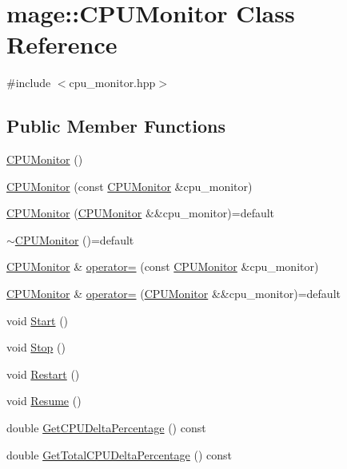 \hypertarget{classmage_1_1_c_p_u_monitor}{}\section{mage\+:\+:C\+P\+U\+Monitor Class Reference}
\label{classmage_1_1_c_p_u_monitor}


{\ttfamily \#include $<$cpu\+\_\+monitor.\+hpp$>$}

\subsection*{Public Member Functions}
\begin{DoxyCompactItemize}
\item 
\hyperlink{classmage_1_1_c_p_u_monitor_a06f9aa6e78b6659617345784f874dec6}{C\+P\+U\+Monitor} ()
\item 
\hyperlink{classmage_1_1_c_p_u_monitor_a381bdfa95b34c591c6fbdb184e889f88}{C\+P\+U\+Monitor} (const \hyperlink{classmage_1_1_c_p_u_monitor}{C\+P\+U\+Monitor} \&cpu\+\_\+monitor)
\item 
\hyperlink{classmage_1_1_c_p_u_monitor_ae2002af06ed2928e41c97e401077ae16}{C\+P\+U\+Monitor} (\hyperlink{classmage_1_1_c_p_u_monitor}{C\+P\+U\+Monitor} \&\&cpu\+\_\+monitor)=default
\item 
\hyperlink{classmage_1_1_c_p_u_monitor_a597ea4b27675a22d3d66a1d817b26652}{$\sim$\+C\+P\+U\+Monitor} ()=default
\item 
\hyperlink{classmage_1_1_c_p_u_monitor}{C\+P\+U\+Monitor} \& \hyperlink{classmage_1_1_c_p_u_monitor_a6009df0994652d011a78d1f12013e599}{operator=} (const \hyperlink{classmage_1_1_c_p_u_monitor}{C\+P\+U\+Monitor} \&cpu\+\_\+monitor)
\item 
\hyperlink{classmage_1_1_c_p_u_monitor}{C\+P\+U\+Monitor} \& \hyperlink{classmage_1_1_c_p_u_monitor_ad931f354e4191429937cb2c3e44290f1}{operator=} (\hyperlink{classmage_1_1_c_p_u_monitor}{C\+P\+U\+Monitor} \&\&cpu\+\_\+monitor)=default
\item 
void \hyperlink{classmage_1_1_c_p_u_monitor_af41d32ea2f96206f0bb963893464d3c4}{Start} ()
\item 
void \hyperlink{classmage_1_1_c_p_u_monitor_aa798a71d7bd5ec79391e6db5f9cf967b}{Stop} ()
\item 
void \hyperlink{classmage_1_1_c_p_u_monitor_a747df3f9e2903a5ade4a0d6ad2a65a05}{Restart} ()
\item 
void \hyperlink{classmage_1_1_c_p_u_monitor_a2821cbe7bd550d42c35a26c72f956f08}{Resume} ()
\item 
double \hyperlink{classmage_1_1_c_p_u_monitor_a6dc9cbb2eddd284d74fef170b5902faa}{Get\+C\+P\+U\+Delta\+Percentage} () const
\item 
double \hyperlink{classmage_1_1_c_p_u_monitor_a547bdf52bd26df18c1272f732393723b}{Get\+Total\+C\+P\+U\+Delta\+Percentage} () const
\end{DoxyCompactItemize}
